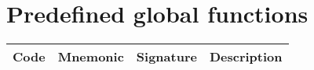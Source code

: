 \section{Predefined global functions}
\label{sec:appendix:primops}

    \tiny
    \begin{longtable}[h]{|l |l | p{.25\linewidth} | p{.5\linewidth} |}
	\hline
Code &   Mnemonic   &  Signature & Description \\
    \hline
    

    \end{longtable}
    \normalsize


